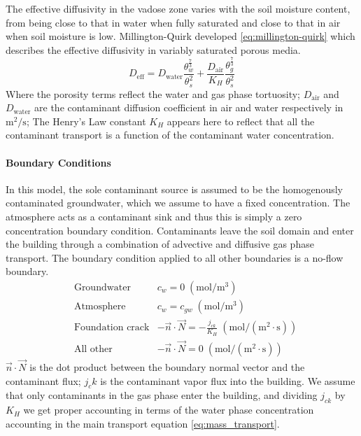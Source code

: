 The effective diffusivity in the vadose zone varies with the soil moisture content, from being close to that in water when fully saturated and close to that in air when soil moisture is low.
Millington-Quirk developed \eqref{eq:millington-quirk} which describes the effective diffusivity in variably saturated porous media.
\begin{equation}\label{eq:millington-quirk}
  D_\mathrm{eff} = D_\mathrm{water} \frac{\theta_w^\frac{7}{3}}{\theta_s^2} + \frac{D_\mathrm{air}}{K_H} \frac{\theta_g^\frac{7}{3}}{\theta_s^2}
\end{equation}
Where the porosity terms reflect the water and gas phase tortuosity;
$D_\mathrm{air}$ and $D_\mathrm{water}$ are the contaminant diffusion coefficient in air and water respectively in $\mathrm{m^2/s}$;
The Henry's Law constant $K_H$ appears here to reflect that all the contaminant transport is a function of the contaminant water concentration.\par

\paragraph{Boundary Conditions}

In this model, the sole contaminant source is assumed to be the homogenously contaminated groundwater, which we assume to have a fixed concentration.
The atmosphere acts as a contaminant sink and thus this is simply a zero concentration boundary condition.
Contaminants leave the soil domain and enter the building through a combination of advective and diffusive gas phase transport.
The boundary condition applied to all other boundaries is a no-flow boundary.
\begin{align}
  &\text{Groundwater} & c_w = 0 \; \mathrm{(mol/m^3)} \\
  &\text{Atmosphere} & c_w = c_{gw} \; \mathrm{(mol/m^3)} \\
  &\text{Foundation crack} & -\vec{n} \cdot \vec{N} = - \frac{j_{ck}}{K_H} \; \mathrm{(mol/(m^2 \cdot s))}\\
  &\text{All other} & -\vec{n} \cdot \vec{N} = 0 \; \mathrm{(mol/(m^2 \cdot s))}
\end{align}
$\vec{n} \cdot \vec{N}$ is the dot product between the boundary normal vector and the contaminant flux;
$j_ck$ is the contaminant vapor flux into the building.
We assume that only contaminants in the gas phase enter the building, and dividing $j_{ck}$ by $K_H$ we get proper accounting in terms of the water phase concentration accounting in the main transport equation \ref{eq:mass_transport}.\par

